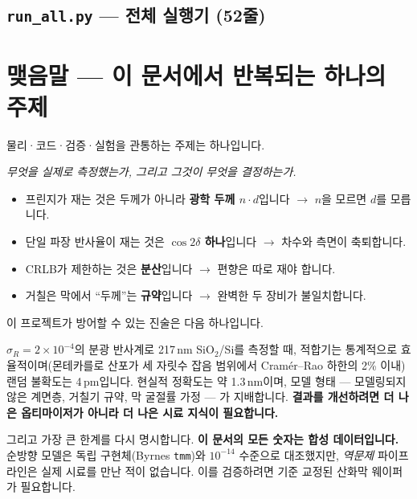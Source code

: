 \documentclass[10pt,a4paper]{article}
\newcommand{\note}[1]{%
  \begin{tcolorbox}[enhanced,breakable,colback=white,colframe=accent,
    boxrule=0pt,leftrule=1.6pt,arc=0pt,outer arc=0pt,
    left=6pt,right=2pt,top=3pt,bottom=3pt,boxsep=0pt,
    before skip=5pt, after skip=8pt]
  #1
  \end{tcolorbox}}
\begin{document}
\subsection{\texttt{run\_all.py} — 전체 실행기 (52줄)}


\section{맺음말 — 이 문서에서 반복되는 하나의 주제}

물리·코드·검증·실험을 관통하는 주제는 하나입니다.

\begin{center}
\emph{무엇을 실제로 측정했는가, 그리고 그것이 무엇을 결정하는가.}
\end{center}

\begin{itemize}[leftmargin=14pt,itemsep=3pt]
\item 프린지가 재는 것은 두께가 아니라 \textbf{광학 두께 $n\cdot d$}입니다 $\to$ $n$을 모르면 $d$를 모릅니다.
\item 단일 파장 반사율이 재는 것은 \textbf{$\cos2\delta$ 하나}입니다 $\to$ 차수와 측면이 축퇴합니다.
\item CRLB가 제한하는 것은 \textbf{분산}입니다 $\to$ 편향은 따로 재야 합니다.
\item 거칠은 막에서 ``두께''는 \textbf{규약}입니다 $\to$ 완벽한 두 장비가 불일치합니다.
\end{itemize}

이 프로젝트가 방어할 수 있는 진술은 다음 하나입니다.

\note{$\sigma_R=2\times10^{-4}$의 분광 반사계로 217\,nm SiO$_2$/Si를 측정할 때, 적합기는
통계적으로 효율적이며(몬테카를로 산포가 세 자릿수 잡음 범위에서 Cramér--Rao 하한의 2\%
이내) 랜덤 불확도는 4\,pm입니다. 현실적 정확도는 약 1.3\,nm이며, 모델 형태 —
모델링되지 않은 계면층, 거칠기 규약, 막 굴절률 가정 — 가 지배합니다.
\textbf{결과를 개선하려면 더 나은 옵티마이저가 아니라 더 나은 시료 지식이 필요합니다.}}

\vspace{6pt}
그리고 가장 큰 한계를 다시 명시합니다. \textbf{이 문서의 모든 숫자는 합성 데이터입니다.}
순방향 모델은 독립 구현체(Byrnes \texttt{tmm})와 $10^{-14}$ 수준으로 대조했지만,
\emph{역문제} 파이프라인은 실제 시료를 만난 적이 없습니다. 이를 검증하려면
기준 교정된 산화막 웨이퍼가 필요합니다.
\end{document}
